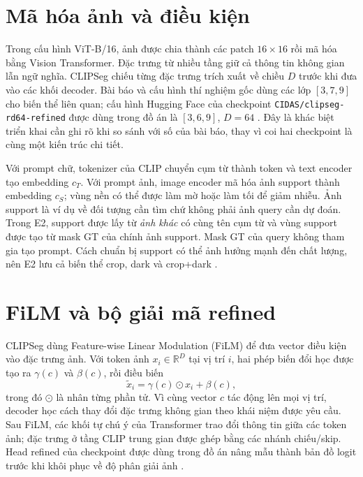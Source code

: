 \section{Mã hóa ảnh và điều kiện}
Trong cấu hình ViT-B/16, ảnh được chia thành các patch $16\times16$ rồi mã hóa bằng Vision Transformer. Đặc trưng từ nhiều tầng giữ cả thông tin không gian lẫn ngữ nghĩa. CLIPSeg chiếu từng đặc trưng trích xuất về chiều $D$ trước khi đưa vào các khối decoder. Bài báo và cấu hình thí nghiệm gốc dùng các lớp $[3,7,9]$ cho biến thể liên quan; cấu hình Hugging Face của checkpoint \texttt{CIDAS/clipseg-rd64-refined} được dùng trong đồ án là $[3,6,9]$, $D=64$ \cite{luddecke2022clipseg,clipsegcode,hfclipseg}. Đây là khác biệt triển khai cần ghi rõ khi so sánh với số của bài báo, thay vì coi hai checkpoint là cùng một kiến trúc chi tiết.

Với prompt chữ, tokenizer của CLIP chuyển cụm từ thành token và text encoder tạo embedding $c_T$. Với prompt ảnh, image encoder mã hóa ảnh support thành embedding $c_S$; vùng nền có thể được làm mờ hoặc làm tối để giảm nhiễu. Ảnh support là ví dụ về đối tượng cần tìm chứ không phải ảnh query cần dự đoán. Trong E2, support được lấy từ \emph{ảnh khác} có cùng tên cụm từ và vùng support được tạo từ mask GT của chính ảnh support. Mask GT của query không tham gia tạo prompt. Cách chuẩn bị support có thể ảnh hưởng mạnh đến chất lượng, nên E2 lưu cả biến thể crop, dark và crop+dark \cite{luddecke2022clipseg,clipsegcode}.

\section{FiLM và bộ giải mã refined}
CLIPSeg dùng Feature-wise Linear Modulation (FiLM) để đưa vector điều kiện vào đặc trưng ảnh. Với token ảnh $x_i\in\mathbb{R}^{D}$ tại vị trí $i$, hai phép biến đổi học được tạo ra $\gamma(c)$ và $\beta(c)$, rồi điều biến
\begin{equation}
  \widetilde{x}_i=\gamma(c)\odot x_i+\beta(c),
  \label{eq:film}
\end{equation}
trong đó $\odot$ là nhân từng phần tử. Vì cùng vector $c$ tác động lên mọi vị trí, decoder học cách thay đổi đặc trưng không gian theo khái niệm được yêu cầu. Sau FiLM, các khối tự chú ý của Transformer trao đổi thông tin giữa các token ảnh; đặc trưng ở tầng CLIP trung gian được ghép bằng các nhánh chiếu/skip. Head refined của checkpoint được dùng trong đồ án nâng mẫu thành bản đồ logit trước khi khôi phục về độ phân giải ảnh \cite{luddecke2022clipseg,hfclipseg}.

